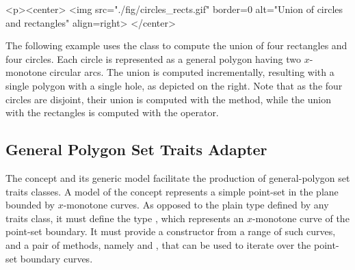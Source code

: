 \lcTex{%
  \setlength{\widthRight}{2.4cm}
  \setlength{\widthLeft}{\widthLineReal}
  \addtolength{\widthLeft}{-\widthRight}
  \begin{minipage}{\widthLeft}
}
\label{fig:circle_recs}
\begin{ccHtmlOnly}
  <p><center>
    <img src="./fig/circles_rects.gif" border=0 alt="Union of circles
    and rectangles" align=right>
  </center>
\end{ccHtmlOnly}
The following example uses the  class
to compute the union of four rectangles and four circles. Each circle
is represented as a general polygon having two $x$-monotone circular arcs.
The union is computed incrementally, resulting with a single polygon with
a single hole, as depicted on the right. Note that as the four circles
are disjoint, their union is computed with the  method,
while the union with the rectangles is computed with the 
operator.


\subsection{General Polygon Set Traits Adapter}
\label{bso_ssec:general_polygon_concept}

The concept  and its generic model 
 facilitate the 
production of general-polygon set traits classes. A model of the concept 
 represents a simple point-set in the plane bounded 
by $x$-monotone curves. As opposed to the plain  type 
defined by any traits class, it must define the type 
, which represents an $x$-monotone curve of the 
point-set boundary. It must provide a constructor from a range of such 
curves, and a pair of methods, namely  and 
, that can be used to iterate over the point-set boundary 
curves.
 
